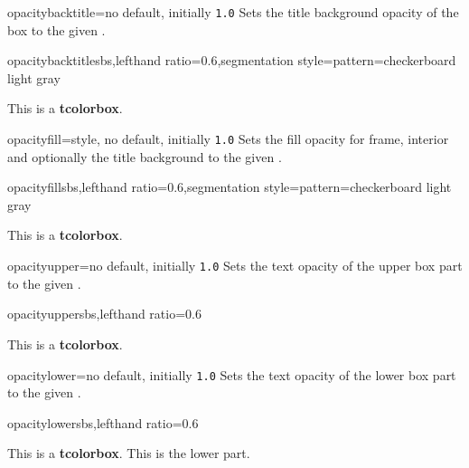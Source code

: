 \begin{docTcbKey}{opacitybacktitle}{=}{no default, initially \texttt{1.0}}
  Sets the title background opacity of the box to the given .
\begin{exdispExample*}{opacitybacktitle}{sbs,lefthand ratio=0.6,segmentation style={pattern=checkerboard light gray}}
\begin{tcolorbox}[standard jigsaw,colframe=red,
  opacityframe=0.5, opacitybacktitle=0.5,
  title filled, title=This is a title]
This is a \textbf{tcolorbox}.
\end{tcolorbox}
\end{exdispExample*}
\end{docTcbKey}


\begin{docTcbKey}{opacityfill}{=}{style, no default, initially \texttt{1.0}}
  Sets the fill opacity for frame, interior and optionally the title background
  to the given .
\begin{exdispExample*}{opacityfill}{sbs,lefthand ratio=0.6,segmentation style={pattern=checkerboard light gray}}
\begin{tcolorbox}[standard jigsaw,colframe=red,
  opacityfill=0.7, title=This is a title]
This is a \textbf{tcolorbox}.
\end{tcolorbox}
\end{exdispExample*}
\end{docTcbKey}

\clearpage
\begin{docTcbKey}{opacityupper}{=}{no default, initially \texttt{1.0}}
  Sets the text opacity of the upper box part to the given .
\begin{exdispExample*}{opacityupper}{sbs,lefthand ratio=0.6}
\begin{tcolorbox}[enhanced,opacityupper=0.5,
  interior style={pattern=checkerboard light gray}]
This is a \textbf{tcolorbox}.
\end{tcolorbox}
\end{exdispExample*}
\end{docTcbKey}


\begin{docTcbKey}{opacitylower}{=}{no default, initially \texttt{1.0}}
  Sets the text opacity of the lower box part to the given .
\begin{exdispExample*}{opacitylower}{sbs,lefthand ratio=0.6}
\begin{tcolorbox}[enhanced,opacitylower=0.5,
  interior style={pattern=checkerboard light gray}]
This is a \textbf{tcolorbox}.
\tcblower
This is the lower part.
\end{tcolorbox}
\end{exdispExample*}
\end{docTcbKey}


